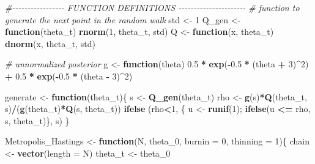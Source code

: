 \documentclass[
]{article}
\newenvironment{Shaded}{\begin{snugshade}}{\end{snugshade}}
\newcommand{\AttributeTok}[1]{\textcolor[rgb]{0.13,0.29,0.53}{#1}}
\newcommand{\CommentTok}[1]{\textcolor[rgb]{0.56,0.35,0.01}{\textit{#1}}}
\newcommand{\ControlFlowTok}[1]{\textcolor[rgb]{0.13,0.29,0.53}{\textbf{#1}}}
\newcommand{\DecValTok}[1]{\textcolor[rgb]{0.00,0.00,0.81}{#1}}
\newcommand{\FloatTok}[1]{\textcolor[rgb]{0.00,0.00,0.81}{#1}}
\newcommand{\FunctionTok}[1]{\textcolor[rgb]{0.13,0.29,0.53}{\textbf{#1}}}
\newcommand{\NormalTok}[1]{#1}
\newcommand{\OtherTok}[1]{\textcolor[rgb]{0.56,0.35,0.01}{#1}}
\newcommand{\SpecialCharTok}[1]{\textcolor[rgb]{0.81,0.36,0.00}{\textbf{#1}}}
\begin{document}
\begin{Shaded}
\begin{Highlighting}[]
\CommentTok{\#{-}{-}{-}{-}{-}{-}{-}{-}{-}{-}{-}{-}{-}{-}{-}{-}{-} FUNCTION DEFINITIONS {-}{-}{-}{-}{-}{-}{-}{-}{-}{-}{-}{-}{-}{-}{-}{-}{-}{-}{-}{-}{-}{-}}
\CommentTok{\# function to generate the next point in the random walk}
\NormalTok{std }\OtherTok{\textless{}{-}} \DecValTok{1}
\NormalTok{Q\_gen }\OtherTok{\textless{}{-}} \ControlFlowTok{function}\NormalTok{(theta\_t) }\FunctionTok{rnorm}\NormalTok{(}\DecValTok{1}\NormalTok{, theta\_t, std)}
\NormalTok{Q     }\OtherTok{\textless{}{-}} \ControlFlowTok{function}\NormalTok{(x, theta\_t) }\FunctionTok{dnorm}\NormalTok{(x, theta\_t, std)}

\CommentTok{\# unnormalized posterior}
\NormalTok{g }\OtherTok{\textless{}{-}} \ControlFlowTok{function}\NormalTok{(theta) }\FloatTok{0.5} \SpecialCharTok{*} \FunctionTok{exp}\NormalTok{(}\SpecialCharTok{{-}}\FloatTok{0.5} \SpecialCharTok{*}\NormalTok{ (theta }\SpecialCharTok{+} \DecValTok{3}\NormalTok{)}\SpecialCharTok{\^{}}\DecValTok{2}\NormalTok{) }\SpecialCharTok{+} \FloatTok{0.5} \SpecialCharTok{*} \FunctionTok{exp}\NormalTok{(}\SpecialCharTok{{-}}\FloatTok{0.5} \SpecialCharTok{*}\NormalTok{ (theta }\SpecialCharTok{{-}} \DecValTok{3}\NormalTok{)}\SpecialCharTok{\^{}}\DecValTok{2}\NormalTok{)}

\NormalTok{generate }\OtherTok{\textless{}{-}} 
    \ControlFlowTok{function}\NormalTok{(theta\_t)\{}
\NormalTok{      s }\OtherTok{\textless{}{-}} \FunctionTok{Q\_gen}\NormalTok{(theta\_t)}
\NormalTok{      rho }\OtherTok{\textless{}{-}} \FunctionTok{g}\NormalTok{(s)}\SpecialCharTok{*}\FunctionTok{Q}\NormalTok{(theta\_t, s)}\SpecialCharTok{/}\NormalTok{(}\FunctionTok{g}\NormalTok{(theta\_t)}\SpecialCharTok{*}\FunctionTok{Q}\NormalTok{(s, theta\_t))}
      \FunctionTok{ifelse}\NormalTok{ (rho}\SpecialCharTok{\textless{}}\DecValTok{1}\NormalTok{, \{ u }\OtherTok{\textless{}{-}} \FunctionTok{runif}\NormalTok{(}\DecValTok{1}\NormalTok{); }\FunctionTok{ifelse}\NormalTok{(u }\SpecialCharTok{\textless{}=}\NormalTok{ rho, s, theta\_t)\}, s)}
\NormalTok{    \}}

\NormalTok{Metropolis\_Hastings }\OtherTok{\textless{}{-}} \ControlFlowTok{function}\NormalTok{(N, theta\_0, }\AttributeTok{burnin =} \DecValTok{0}\NormalTok{, }\AttributeTok{thinning =} \DecValTok{1}\NormalTok{)\{}
\NormalTok{  chain }\OtherTok{\textless{}{-}} \FunctionTok{vector}\NormalTok{(}\AttributeTok{length =}\NormalTok{ N)}
\NormalTok{  theta\_t }\OtherTok{\textless{}{-}}\NormalTok{ theta\_0}
  

\end{Highlighting}
\end{Shaded}
\end{document}
